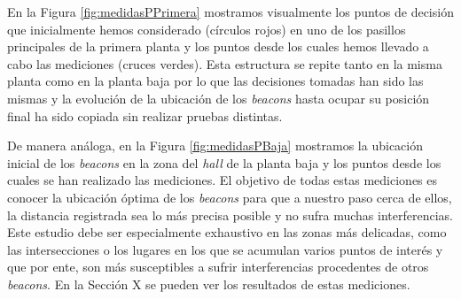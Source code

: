 En la Figura \ref{fig:medidasPPrimera} mostramos visualmente los puntos de decisión que inicialmente hemos considerado (círculos rojos) en uno de los pasillos principales de la primera planta y los puntos desde los cuales hemos llevado a cabo las mediciones (cruces verdes). Esta estructura se repite tanto en la misma planta como en la planta baja por lo que las decisiones tomadas han sido las mismas y la evolución de la ubicación de los \textit{beacons} hasta ocupar su posición final ha sido copiada sin realizar pruebas distintas.

De manera análoga, en la Figura \ref{fig:medidasPBaja} mostramos la ubicación inicial de los \textit{beacons} en la zona del \textit{hall} de la planta baja y los puntos desde los cuales se han realizado las mediciones. El objetivo de todas estas mediciones es conocer la ubicación óptima de los \textit{beacons} para que a nuestro paso cerca de ellos, la distancia registrada sea lo más precisa posible y no sufra muchas interferencias. Este estudio debe ser especialmente exhaustivo en las zonas más delicadas, como las intersecciones o los lugares en los que se acumulan varios puntos de interés y que por ente, son más susceptibles a sufrir interferencias procedentes de otros \textit{beacons}. En la Sección X se pueden ver los resultados de estas mediciones. 

